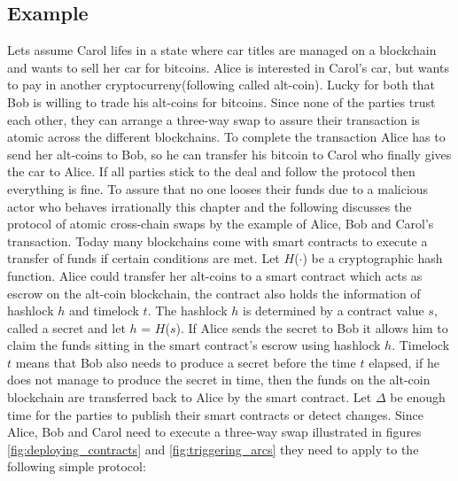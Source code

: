 

\subsection{Example}
\label{subsec:background:second_section:example}

Lets assume Carol lifes in a state where car titles are managed on a blockchain and wants to sell her car for bitcoins. Alice is interested in Carol's car, but wants to pay in another cryptocurreny(following called alt-coin). Lucky for both that Bob is willing to trade his alt-coins for bitcoins. Since none of the parties trust each other, they can arrange a three-way swap to assure their transaction is atomic across the different blockchains. To complete the transaction Alice has to send her alt-coins to Bob, so he can transfer his bitcoin to Carol who finally gives the car to Alice. If all parties stick to the deal and follow the protocol then everything is fine. To assure that no one looses their funds due to a malicious actor who behaves irrationally this chapter and the following discusses the protocol of atomic cross-chain swaps by the example of Alice, Bob and Carol's transaction. Today many blockchains come with smart contracts to execute a transfer of funds if certain conditions are met.
Let $H$($\cdot$) be a cryptographic hash function. Alice could transfer her alt-coins to a smart contract which acts as escrow on the alt-coin blockchain, the contract also holds the information of hashlock $h$ and timelock $t$. The hashlock $h$ is determined by a contract value $s$, called a secret and let $h$ = $H$($s$). If Alice sends the secret to Bob it allows him to claim the funds sitting in the smart contract's escrow using hashlock $h$. Timelock $t$ means that Bob also needs to produce a secret before the time $t$ elapsed, if he does not manage to produce the secret in time, then the funds on the alt-coin blockchain are transferred back to Alice by the smart contract. Let $\Delta$ be enough time for the parties to publish their smart contracts or detect changes. Since Alice, Bob and Carol need to execute a three-way swap illustrated in figures \ref{fig:deploying_contracts} and \ref{fig:triggering_arcs} they need to apply to the following simple protocol: \newline


